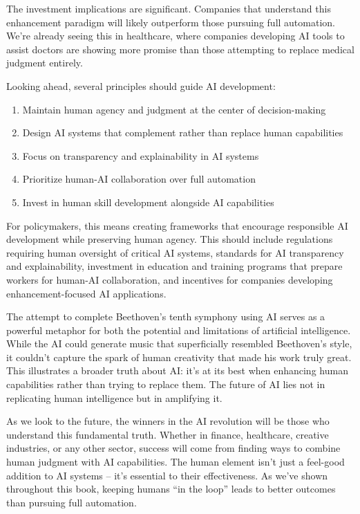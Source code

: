 \documentclass[
  Letterpaper,
]{scrbook}
\providecommand{\tightlist}{%
  \setlength{\itemsep}{0pt}\setlength{\parskip}{0pt}}\usepackage{longtable,booktabs,array}
\begin{document}
The investment implications are significant. Companies that understand
this enhancement paradigm will likely outperform those pursuing full
automation. We're already seeing this in healthcare, where companies
developing AI tools to assist doctors are showing more promise than
those attempting to replace medical judgment entirely.

Looking ahead, several principles should guide AI development:

\begin{enumerate}
\def\labelenumi{\arabic{enumi}.}
\tightlist
\item
  Maintain human agency and judgment at the center of decision-making
\item
  Design AI systems that complement rather than replace human
  capabilities
\item
  Focus on transparency and explainability in AI systems
\item
  Prioritize human-AI collaboration over full automation
\item
  Invest in human skill development alongside AI capabilities
\end{enumerate}

For policymakers, this means creating frameworks that encourage
responsible AI development while preserving human agency. This should
include regulations requiring human oversight of critical AI systems,
standards for AI transparency and explainability, investment in
education and training programs that prepare workers for human-AI
collaboration, and incentives for companies developing
enhancement-focused AI applications.

The attempt to complete Beethoven's tenth symphony using AI serves as a
powerful metaphor for both the potential and limitations of artificial
intelligence. While the AI could generate music that superficially
resembled Beethoven's style, it couldn't capture the spark of human
creativity that made his work truly great. This illustrates a broader
truth about AI: it's at its best when enhancing human capabilities
rather than trying to replace them. The future of AI lies not in
replicating human intelligence but in amplifying it.

As we look to the future, the winners in the AI revolution will be those
who understand this fundamental truth. Whether in finance, healthcare,
creative industries, or any other sector, success will come from finding
ways to combine human judgment with AI capabilities. The human element
isn't just a feel-good addition to AI systems -- it's essential to their
effectiveness. As we've shown throughout this book, keeping humans ``in
the loop'' leads to better outcomes than pursuing full automation.
\end{document}
